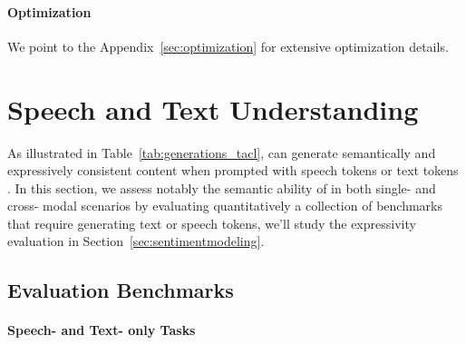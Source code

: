\paragraph{Optimization}
We point to the Appendix~\ref{sec:optimization} for extensive optimization details.  %

\section{Speech and Text Understanding} \label{sec:speechtextunderstanding}

As illustrated in Table~\ref{tab:generations_tacl}, \spot can generate semantically and expressively consistent content when prompted with speech tokens or text tokens
. In this section, we assess notably the semantic ability of \spot in both single- and cross- modal scenarios by evaluating quantitatively a collection of benchmarks that require generating text or speech tokens, we'll study the \spot expressivity evaluation in Section~\ref{sec:sentimentmodeling}.

\subsection{Evaluation Benchmarks}

\paragraph{Speech- and Text- only Tasks}

